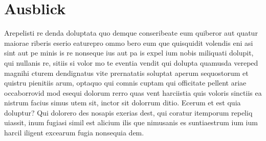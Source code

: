 \section{Ausblick}
\label{sec:Ausblick}
Arepelisti re denda doluptata quo demque conseribeate eum quiberor aut quatur maiorae riberis eserio eaturepro ommo bero eum que quisquidit volendis eni asi sint aut pe minis is re nonseque ius aut pa is expel ium nobis miliquati dolupit, qui nullanis re, sitiis si volor mo te eventia vendit qui dolupta quamusda vereped magnihi cturem dendignatus vite prernatatis soluptat aperum sequostorum et quistru pienitiis arum, optaquo qui comnis cuptam qui officitate pellent ariae occaborrovid mod esequi dolorum rerro quas vent harciistia quis voloris sinctiis ea nistrum facius simus utem sit, inctor sit dolorrum ditio. Ecerum et est quia doluptur? Qui dolorero des nosapis exerias dest, qui coratur itemporum repeliq uiassit, inum fugiasi simil est alicium ilis que nimusanis es suntiaestrum ium ium harcil iligent excearum fugia nonsequia dem.

